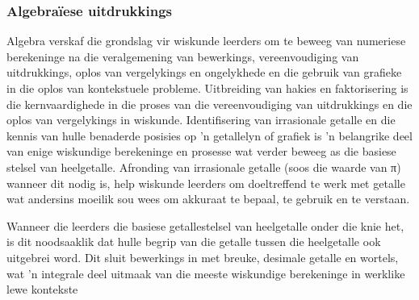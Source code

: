 \subsubsection{Algebra\"{i}ese uitdrukkings}
Algebra verskaf die grondslag vir wiskunde leerders om te beweeg van numeriese berekeninge na die veralgemening van bewerkings, vereenvoudiging van uitdrukkings, oplos van vergelykings en ongelykhede en die gebruik van grafieke in die oplos van kontekstuele probleme. Uitbreiding van hakies en faktorisering is die kernvaardighede in die proses van die vereenvoudiging van uitdrukkings en die oplos van vergelykings in wiskunde. Identifisering van irrasionale getalle en die kennis van hulle benaderde posisies op 'n getallelyn of grafiek is 'n belangrike deel van enige wiskundige berekeninge en prosesse wat verder beweeg as die basiese stelsel van heelgetalle. Afronding van irrasionale getalle (soos die waarde van π) wanneer dit nodig is, help wiskunde leerders om doeltreffend te werk met getalle wat andersins moeilik sou wees om akkuraat te bepaal, te gebruik en te verstaan.

\par
Wanneer die leerders die basiese getallestelsel van heelgetalle onder die knie het, is dit noodsaaklik dat hulle begrip van die getalle tussen die heelgetalle ook uitgebrei word. Dit sluit bewerkings in met breuke, desimale getalle en wortels, wat 'n integrale deel uitmaak van die meeste wiskundige berekeninge in werklike lewe kontekste\par

